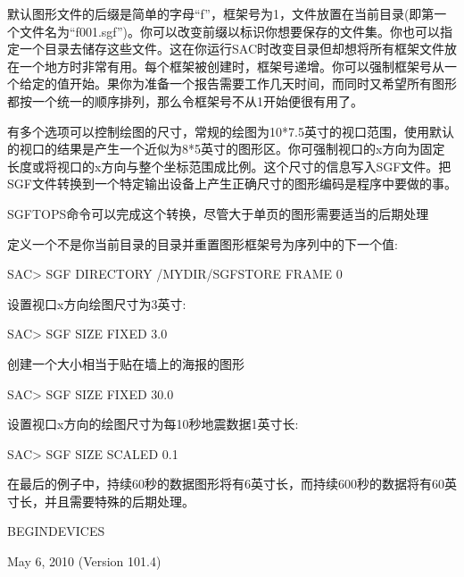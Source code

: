 默认图形文件的后缀是简单的字母``f''，框架号为1，文件放置在当前目录(即第一个文件名为``f001.sgf'')。你可以改变前缀以标识你想要保存的文件集。你也可以指定一个目录去储存这些文件。这在你运行SAC时改变目录但却想将所有框架文件放在一个地方时非常有用。每个框架被创建时，框架号递增。你可以强制框架号从一个给定的值开始。果你为准备一个报告需要工作几天时间，而同时又希望所有图形都按一个统一的顺序排列，那么令框架号不从1开始便很有用了。

有多个选项可以控制绘图的尺寸，常规的绘图为10*7.5英寸的视口范围，使用默认的视口的结果是产生一个近似为8*5英寸的图形区。你可强制视口的x方向为固定长度或将视口的x方向与整个坐标范围成比例。这个尺寸的信息写入SGF文件。把SGF文件转换到一个特定输出设备上产生正确尺寸的图形编码是程序中要做的事。

SGFTOPS命令可以完成这个转换，尽管大于单页的图形需要适当的后期处理 

定义一个不是你当前目录的目录并重置图形框架号为序列中的下一个值:
\begin{SACCode}
SAC> SGF DIRECTORY /MYDIR/SGFSTORE FRAME 0
\end{SACCode}

设置视口x方向绘图尺寸为3英寸:
\begin{SACCode}
SAC> SGF SIZE FIXED 3.0
\end{SACCode}

创建一个大小相当于贴在墙上的海报的图形
\begin{SACCode}
SAC> SGF SIZE FIXED 30.0
\end{SACCode}

设置视口x方向的绘图尺寸为每10秒地震数据1英寸长:
\begin{SACCode}
SAC> SGF SIZE SCALED 0.1
\end{SACCode}
在最后的例子中，持续60秒的数据图形将有6英寸长，而持续600秒的数据将有60英寸长，并且需要特殊的后期处理。

BEGINDEVICES

May 6, 2010 (Version 101.4)
